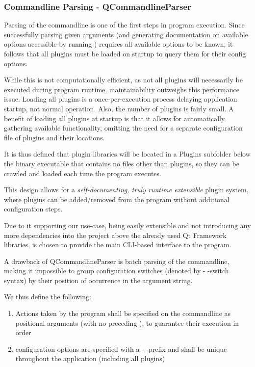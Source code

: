\subsubsection{Commandline Parsing - QCommandlineParser}
Parsing of the commandline is one of the first steps in program execution. Since successfully parsing given arguments (and generating documentation on available options accessible by running ) requires all available options to be known, it follows that all plugins must be loaded on startup to query them for their config options.

While this is not computationally efficient, as not all plugins will necessarily be executed during program runtime, maintainability outweighs this performance issue.
Loading all plugins is a once-per-execution process delaying application startup, not normal operation. Also, the number of plugins is fairly small. A benefit of loading all plugins at startup is that it allows for automatically gathering available functionality, omitting the need for a separate configuration file of plugins and their locations.

It is thus defined that plugin libraries will be located in a Plugins subfolder below the binary executable that contains no files other than plugins, so they can be crawled and loaded each time the program executes.

This design allows for a \emph{self-documenting, truly runtime extensible} plugin system, where plugins can be added/removed from the program without additional configuration steps.

Due to it supporting our use-case, being easily extensible and not introducing any more dependencies into the project above the already used Qt Framework libraries,  is chosen to provide the main CLI-based interface to the program.

A drawback of QCommandlineParser is batch parsing of the commandline, making it impossible to group configuration switches (denoted by - -switch syntax) by their position of occurrence in the argument string.

We thus define the following:
\begin{enumerate}
	\item Actions taken by the program shall be specified on the commandline as positional arguments (with no preceding \cmd{-}), to guarantee their execution in order
	\item configuration options are specified with a - -prefix and shall be unique throughout the application (including all plugins)
\end{enumerate}


